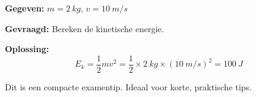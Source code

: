 \documentclass[a4paper,11pt]{article}
\begin{document}
\begin{oefenblok}[Oefening 1]
\textbf{Gegeven:} $m = \SI{2}{kg}$, $v = \SI{10}{m/s}$

\textbf{Gevraagd:} Bereken de kinetische energie.

\textbf{Oplossing:}
\[ E_k = \frac{1}{2}mv^2 = \frac{1}{2} \times \SI{2}{kg} \times (\SI{10}{m/s})^2 = \SI{100}{J} \]
\end{oefenblok}

\begin{examenbox}
Dit is een compacte examentip. Ideaal voor korte, praktische tips.
\end{examenbox}

\newpage
\appendix

\printsymbols
\printformularium
\end{document}
